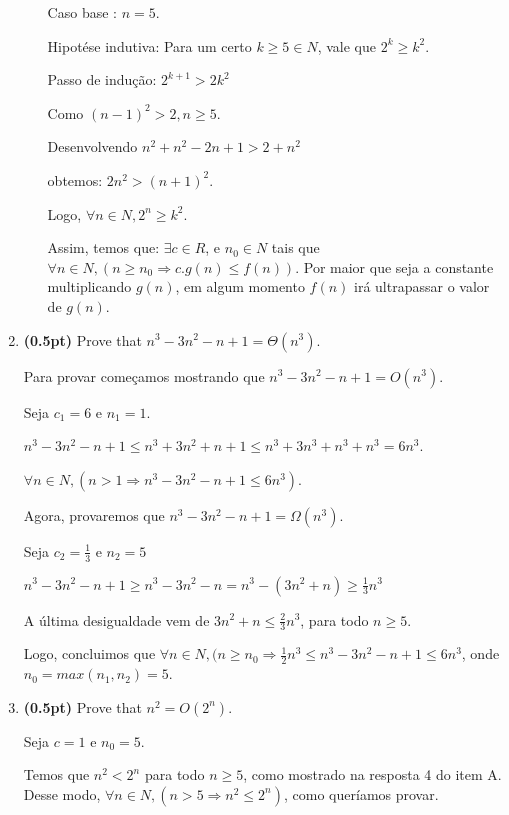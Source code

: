 \documentclass{article}
\begin{document}
\begin{enumerate}[label=\Alph*]
\begin{itemize}
      Caso base : $n = 5$.
      
      Hipotése indutiva: Para um certo $k \geq 5 \in N$, vale que $2^{k} \geq k^{2}$.
      
      Passo de indução: $2^{k + 1} > 2k^{2} $
      
      Como $ (n - 1)^{2} > 2, n \geq 5$.
      
      Desenvolvendo $n^{2} + n^{2} - 2n + 1 > 2 + n^{2} $
      
      obtemos: $ 2n^{2} > (n + 1)^{2}$.
      
      Logo, $\forall n \in N , 2^{n} \geq k^{2}$.
      
      Assim, temos que: $ \exists c\in R$, e  $n_{0} \in N$ tais que $ \forall n \in N, (n \geq n_{0} \Rightarrow c.g(n) \leq f(n)).$ Por maior que seja a constante multiplicando $g(n)$, em algum momento $f(n)$ irá ultrapassar o valor de $g(n)$.

    \end{itemize}
  
  \item \textbf{(0.5pt)} Prove that $n^3 -3n^2 -n+1 = \Theta(n^3)$.
  
  Para provar começamos mostrando que $n^{3} - 3n^{2} - n + 1 = O(n^{3})$. 
  
  Seja $c_{1} = 6$ e $n_{1} = 1$.
  
  $n^{3} - 3n^{2} - n + 1 \leq n^{3} + 3n^{2} + n + 1 \leq n^{3} + 3n^{3} + n^{3} + n^{3} = 6n^{3}$.
  
  $ \forall n \in N, (n > 1 \Rightarrow n^{3} - 3n^{2} - n + 1 \leq 6n^{3})$.
  
  Agora, provaremos que $n^{3} - 3n^{2} - n + 1 = \Omega(n^{3})$.
  
  Seja $c_{2} = \frac{1}{3}$ e $n_{2} = 5$
  
  $n^{3} - 3n^{2} - n + 1 \geq n^{3} - 3n^{2} - n = n^{3} - (3n^{2} + n) \geq \frac{1}{3}n^{3}$
  
  A última desigualdade vem de $3n^{2} + n \leq \frac{2}{3}n^{3} $, para todo $n \geq 5$.
  
  Logo, concluimos que $\forall n \in N,  (n \geq n_{0} \Rightarrow \frac{1}{2}n^{3} \leq n^{3} - 3n^{2} - n + 1 \leq 6n^{3}$,  onde $n_{0} = max (n_{1},n_{2})= 5$.
  
  \item \textbf{(0.5pt)} Prove that $n^2 = O(2^n)$.
  
  Seja $c = 1$ e  $n_{0} = 5$.
  
  Temos que $n^{2} < 2^{n}$ para todo $n \geq 5$, como mostrado na resposta 4 do item A. Desse modo, $ \forall n \in N, (n > 5 \Rightarrow n^{2} \leq 2^{n})$, como queríamos provar.
  
\end{enumerate}
\end{document}

